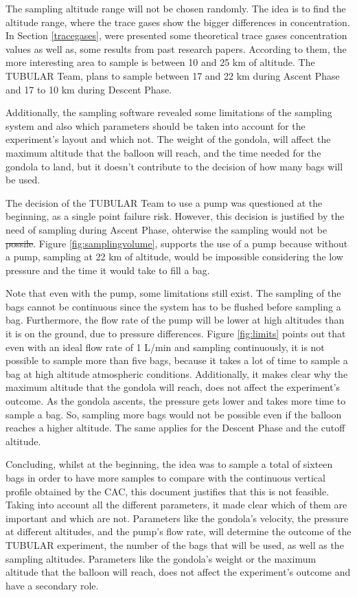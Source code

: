 \documentclass[a4paper,12pt,oneside]{article} %
\providecommand{\DIFaddtex}[1]{{\protect\color{blue}\uwave{#1}}} %
\providecommand{\DIFdeltex}[1]{{\protect\color{red}\sout{#1}}}                      %
\providecommand{\DIFaddbegin}{} %
\providecommand{\DIFaddend}{} %
\providecommand{\DIFdelbegin}{} %
\providecommand{\DIFdelend}{} %
\providecommand{\DIFadd}[1]{\texorpdfstring{\DIFaddtex{#1}}{#1}} %
\providecommand{\DIFdel}[1]{\texorpdfstring{\DIFdeltex{#1}}{}} %
\newcommand{\DIFscaledelfig}{0.5}
\newlength{\DIFdelgraphicswidth} %
\newlength{\DIFdelgraphicsheight} %
\newcommand{\DIFaddincludegraphics}[2][]{{\color{blue}\fbox{\DIFOincludegraphics[#1]{#2}}}} %
\newcommand{\DIFdelincludegraphics}[2][]{%
\sbox{\DIFdelgraphicsbox}{\DIFOincludegraphics[#1]{#2}}%
\settoboxwidth{\DIFdelgraphicswidth}{\DIFdelgraphicsbox} %
\settoboxtotalheight{\DIFdelgraphicsheight}{\DIFdelgraphicsbox} %
\scalebox{\DIFscaledelfig}{%
\parbox[b]{\DIFdelgraphicswidth}{\usebox{\DIFdelgraphicsbox}\\[-\baselineskip] \rule{\DIFdelgraphicswidth}{0em}}\llap{\resizebox{\DIFdelgraphicswidth}{\DIFdelgraphicsheight}{%
\setlength{\unitlength}{\DIFdelgraphicswidth}%
\begin{picture}(1,1)%
\thicklines\linethickness{2pt} %
{\color[rgb]{1,0,0}\put(0,0){\framebox(1,1){}}}%
{\color[rgb]{1,0,0}\put(0,0){\line( 1,1){1}}}%
{\color[rgb]{1,0,0}\put(0,1){\line(1,-1){1}}}%
\end{picture}%
}\hspace*{3pt}}} %
} %
\DeclareRobustCommand{\DIFaddbegin}{\DIFOaddbegin \let\includegraphics\DIFaddincludegraphics} %
\DeclareRobustCommand{\DIFaddend}{\DIFOaddend \let\includegraphics\DIFOincludegraphics} %
\DeclareRobustCommand{\DIFdelbegin}{\DIFOdelbegin \let\includegraphics\DIFdelincludegraphics} %
\DeclareRobustCommand{\DIFdelend}{\DIFOaddend \let\includegraphics\DIFOincludegraphics} %
\begin{document}
\begin{appendices}
The sampling altitude range will not be chosen randomly. The idea is to find the altitude range, where the trace gases show the bigger differences in concentration. In Section \ref{tracegases}, were presented some theoretical trace gases concentration values as well as, some results from past research papers. According to them, the more interesting area to sample is between 10 and 25 km of altitude. The TUBULAR Team, plans to sample between 17 and 22 km during Ascent Phase and 17 to 10 km during Descent Phase. 

Additionally, the sampling software revealed some limitations of the sampling system and also which parameters should be taken into account for the experiment's layout and which not. 
The weight of the gondola, will affect the maximum altitude that the balloon will reach, and the time needed for the gondola to land, but it doesn't contribute to the decision of how many bags will be used.

The decision of the TUBULAR Team to use a pump was questioned at the beginning, as a single point failure risk. However, this decision is justified by the need of sampling during Ascent Phase, ohterwise the sampling would not be \DIFdelbegin \DIFdel{possile}\DIFdelend \DIFaddbegin \DIFadd{possible}\DIFaddend .  Figure \ref{fig:samplingvolume}, supports the use of a pump because without a pump, sampling at 22 km of altitude, would be impossible considering the low pressure and the time it would take to fill a bag. 

Note that even with the pump, some limitations still exist. The sampling of the bags cannot be continuous since the system has to be flushed before sampling a bag. Furthermore, the flow rate of the pump will be lower at high altitudes than it is on the ground, due to pressure differences. Figure \ref{fig:limits} points out that even with an ideal flow rate of 1 L/min and sampling continuously, it is not possible to sample more than five bags, because it takes a lot of time to sample a bag at high altitude atmospheric conditions. Additionally, it makes clear why the maximum altitude that the gondola will reach, does not affect the experiment's outcome. As the gondola ascents, the pressure gets lower and takes more time to sample a bag. So, sampling more bags would not be possible even if the balloon reaches a higher altitude. The same applies for the Descent Phase and the cutoff altitude. 

Concluding, whilst at the beginning, the idea was to sample a total of sixteen bags in order to have more samples to compare with the continuous vertical profile obtained by the CAC, this document justifies that this is not feasible. Taking into account all the different parameters, it made clear which of them are important and which are not. Parameters like the gondola's velocity, the pressure at different altitudes, and the pump's flow rate, will determine the outcome of the TUBULAR experiment, the number of the bags that will be used, as well as the sampling altitudes. Parameters like the gondola's weight or the maximum altitude that the balloon will reach, does not affect the experiment's outcome and have a secondary role.



\end{appendices}
\end{document}
